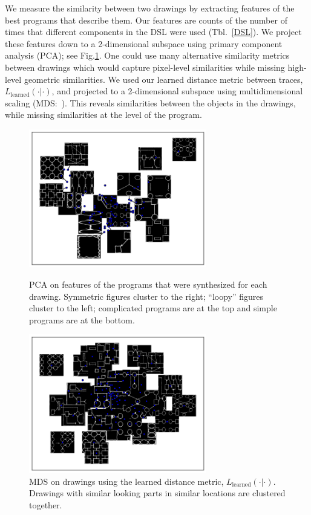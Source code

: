 \documentclass{article}
\begin{document}
We measure the similarity between two drawings by extracting features
of the best programs that describe them. Our features are counts of the number of times that different components in the
DSL were used (Tbl.~\ref{DSL}).  We project these features down to a
2-dimensional subspace using primary component analysis
(PCA); see Fig.\ref{NMF}.  One could use many
alternative similarity metrics between drawings which would capture pixel-level similarities while missing high-level geometric similarities.
We used our learned distance metric between traces, $L_{\text{learned}}(\cdot|\cdot)$, and projected to a 2-dimensional subspace using multidimensional scaling (MDS:~\cite{cox2008multidimensional}). This reveals similarities between the objects in the drawings,
while missing similarities at the level of the program.
\begin{figure}[h]
\centering  \begin{minipage}{\textwidth}\centering
  \includegraphics[width = 0.69\textwidth]{figures/PCA_improved.png}
    \caption{PCA on features of the programs that were synthesized for each drawing. Symmetric figures cluster to the right; ``loopy'' figures cluster to the left; complicated programs are at the top and simple programs are at the bottom.}    \label{NMF}
  \end{minipage} %
  \begin{minipage}{\textwidth}\centering
    \includegraphics[width = 0.69\textwidth]{figures/imageSimilarity.png} 
    \caption{MDS on drawings using the learned distance metric, $L_{\text{learned}}(\cdot|\cdot)$. Drawings with similar looking parts in similar locations are clustered together.}
  \end{minipage}
\end{figure}
\end{document}
